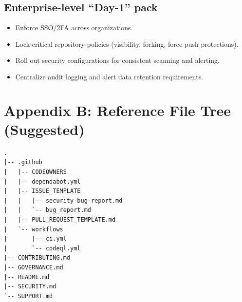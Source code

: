 \documentclass[11pt]{article}
\begin{document}
\subsection{Enterprise-level ``Day-1'' pack}
\begin{checklistbox}[title={Enterprise Baseline}]
\begin{itemize}[leftmargin=*,itemsep=2pt]
  \item Enforce SSO/2FA across organizations.
  \item Lock critical repository policies (visibility, forking, force push protections).
  \item Roll out security configurations for consistent scanning and alerting.
  \item Centralize audit logging and alert data retention requirements.
\end{itemize}
\end{checklistbox}

\section{Appendix B: Reference File Tree (Suggested)}

\begin{examplebox}[title={Example repository structure for community health + security configs}]
\begin{verbatim}
.
|-- .github
|   |-- CODEOWNERS
|   |-- dependabot.yml
|   |-- ISSUE_TEMPLATE
|   |   |-- security-bug-report.md
|   |   `-- bug_report.md
|   |-- PULL_REQUEST_TEMPLATE.md
|   `-- workflows
|       |-- ci.yml
|       `-- codeql.yml
|-- CONTRIBUTING.md
|-- GOVERNANCE.md
|-- README.md
|-- SECURITY.md
`-- SUPPORT.md
\end{verbatim}
\end{examplebox}
\end{document}
